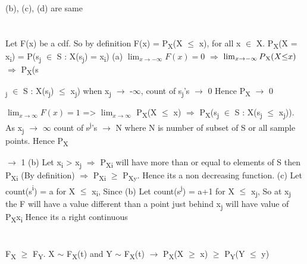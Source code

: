 \documentclass{report}
\begin{document}
{	(b), (c), (d) are same
	
	\section{}
	Let F(x) be a cdf. So by definition F(x) = P{\textsubscript{X}}(X {$\le$} x), for all x {$\in$} X. P{\textsubscript{X}}(X = x{\textsubscript{i}}) = P({s{\textsubscript{j}} {$\in$} S : X(s{\textsubscript{j}}) = x{\textsubscript{i}}})
	{\newline}
	(a) {$\lim_{x {\rightarrow} -{\infty}}F(x) = 0$} {$\Rightarrow$} {$\lim_{x {\rightarrow} -{\infty}}P{\textsubscript{X}}(X {\le} x)$} {$\Rightarrow$} P{\textsubscript{X}}(s{\textsubscript{j} {$\in$} S : X(s{\textsubscript{j}) {$\le$} x{\textsubscript{j}})} when x{\textsubscript{j}} {$\rightarrow$} -{$\infty$}, count of s{\textsubscript{j}}'s {$\rightarrow$} 0 Hence P{\textsubscript{X}} {$\rightarrow$} 0
		
	{$\lim_{x {\rightarrow} {\infty}}F(x) = 1$} => {$\lim_{x {\rightarrow} {\infty}}$} P{\textsubscript{X}(X {$\le$} x)} {$\Rightarrow$} P{\textsubscript{X}}(s{\textsubscript{j}} {$\in$} S : X(s{\textsubscript{j} {$\le$} x{\textsubscript{j}}})). As x{\textsubscript{j}} {$\rightarrow$} {$\infty$} count of s{\textsuperscript{j}}'s {$\rightarrow$} N where N is number of subset of S or all sample points. Hence P{\textsubscript{X}}} {$\rightarrow$} 1
	{\newline}
	(b) Let x{\textsubscript{i}} > x{\textsubscript{j}} {$\Rightarrow$} P{\textsubscript{Xi}} will have more than or equal to elements of S then P{\textsubscript{Xi}} (By definition) {$\Rightarrow$} P{\textsubscript{Xi}} {$\ge$} P{\textsubscript{Xy}}. Hence its a non decreasing function.
	{\newline}
	(c) Let count(s{\textsuperscript{i}}) = a for X {$\le$} x{\textsubscript{i}}, Since (b) Let count(s{\textsuperscript{j}}) = a+1 for X {$\le$} x{\textsubscript{j}}, So at x{\textsubscript{j}} the F will have a value different than a point just behind x{\textsubscript{j}} will have value of P{\textsubscript{X}}{x{\textsubscript{i}}} Hence its a right continuous
	{\newline}
	
	\section{}
	F{\textsubscript{X}} {$\ge$} F{\textsubscript{Y}}. X {$\sim$} F{\textsubscript{X}}(t) and Y {$\sim$} F{\textsubscript{X}}(t) {$\rightarrow$} P{\textsubscript{X}}(X {$\ge$} x) {$\ge$} P{\textsubscript{Y}}(Y {$\le$} y) 
	
}
\end{document}
